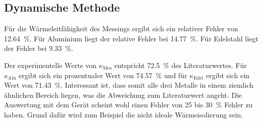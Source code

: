 \subsection{Dynamische Methode}
Für die Wärmeleitfähigkeit des Messings ergibt sich ein relativer Fehler von \SI{12.64}{\percent}. Für Aluminium liegt der relative 
Fehler bei \SI{14.77}{\percent}. Für Edelstahl liegt der Fehler bei \SI{9.33}{\percent}. 

\noindent Der experimentelle Werte von $\kappa_\text{Mes}$ entspricht \SI{72.5}{\percent} des Literaturwertes. 
Für $\kappa_\text{Alu}$ ergibt sich ein prozentualer Wert von \SI{74.57}{\percent} und für $\kappa_\text{Edel}$ ergibt sich ein Wert 
von \SI{71.43}{\percent}. Interessant ist, dass somit alle drei Metalle in einem ziemlich ähnlichen Bereich liegen, was die Abweichung zum Literaturwert angeht. 
Die Auswertung mit dem Gerät scheint wohl einen Fehler von \num{25} bis \SI{30}{\percent} Fehler zu haben. Grund dafür wird zum Beispiel die nicht ideale Wärmeisolierung sein.



